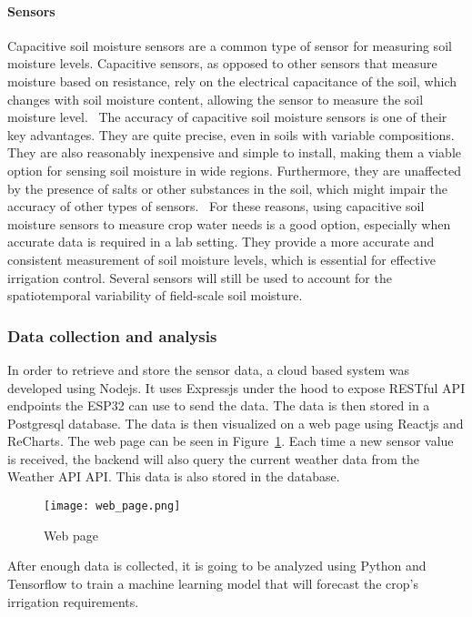 \documentclass[11pt]{scrartcl} %
\begin{document}
\paragraph{Sensors}
\label{sec:sensors}
Capacitive soil moisture sensors are a common type of sensor for measuring soil moisture levels. Capacitive sensors, as opposed to other sensors that measure moisture based on resistance, rely on the electrical capacitance of the soil, which changes with soil moisture content, allowing the sensor to measure the soil moisture level.~\parencite{sensor_types}
\newline The accuracy of capacitive soil moisture sensors is one of their key advantages. They are quite precise, even in soils with variable compositions. They are also reasonably inexpensive and simple to install, making them a viable option for sensing soil moisture in wide regions. Furthermore, they are unaffected by the presence of salts or other substances in the soil, which might impair the accuracy of other types of sensors.~\parencite{sensor_types}
\newline For these reasons, using capacitive soil moisture sensors to measure crop water needs is a good option, especially when accurate data is required in a lab setting. They provide a more accurate and consistent measurement of soil moisture levels, which is essential for effective irrigation control. Several sensors will still be used to account for the spatiotemporal variability of field-scale soil moisture.~\parencite{sensor_types}
\subsubsection{Data collection and analysis}
\label{sec:data_collection}
In order to retrieve and store the sensor data, a cloud based system was developed using \gls{Nodejs}. It uses \gls{Expressjs} under the hood to expose RESTful API endpoints the ESP32 can use to send the data. The data is then stored in a \gls{Postgresql} database. The data is then visualized on a web page using \gls{Reactjs} and \gls{ReCharts}. The web page can be seen in Figure~\ref{fig:web_page}.
Each time a new sensor value is received, the backend will also query the current weather data from the \gls{Weather API} API. This data is also stored in the database.
\begin{figure}[h]
	\centering
	\texttt{[image: web\_page.png]}
	\caption{Web page}
	\label{fig:web_page}
\end{figure}
\newline After enough data is collected, it is going to be analyzed using \gls{Python} and \gls{Tensorflow} to train a machine learning model that will forecast the crop's irrigation requirements.
\end{document}
